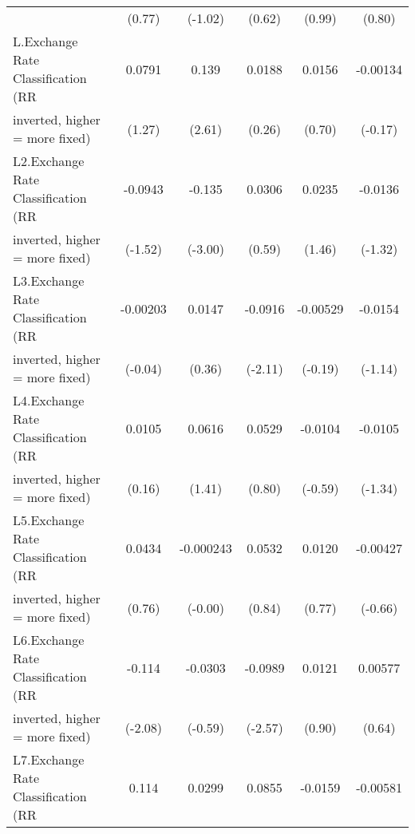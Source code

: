 {\begin{tabular}{l*{5}{c}}
                                        &    (0.77)         &   (-1.02)         &    (0.62)         &    (0.99)         &    (0.80)         \\
\addlinespace
L.Exchange Rate Classification (RR      &    0.0791         &     0.139\sym{*}  &    0.0188         &    0.0156         &  -0.00134         \\
inverted, higher = more fixed)          &    (1.27)         &    (2.61)         &    (0.26)         &    (0.70)         &   (-0.17)         \\
\addlinespace
L2.Exchange Rate Classification (RR     &   -0.0943         &    -0.135\sym{**} &    0.0306         &    0.0235         &   -0.0136         \\
inverted, higher = more fixed)          &   (-1.52)         &   (-3.00)         &    (0.59)         &    (1.46)         &   (-1.32)         \\
\addlinespace
L3.Exchange Rate Classification (RR     &  -0.00203         &    0.0147         &   -0.0916\sym{*}  &  -0.00529         &   -0.0154         \\
inverted, higher = more fixed)          &   (-0.04)         &    (0.36)         &   (-2.11)         &   (-0.19)         &   (-1.14)         \\
\addlinespace
L4.Exchange Rate Classification (RR     &    0.0105         &    0.0616         &    0.0529         &   -0.0104         &   -0.0105         \\
inverted, higher = more fixed)          &    (0.16)         &    (1.41)         &    (0.80)         &   (-0.59)         &   (-1.34)         \\
\addlinespace
L5.Exchange Rate Classification (RR     &    0.0434         & -0.000243         &    0.0532         &    0.0120         &  -0.00427         \\
inverted, higher = more fixed)          &    (0.76)         &   (-0.00)         &    (0.84)         &    (0.77)         &   (-0.66)         \\
\addlinespace
L6.Exchange Rate Classification (RR     &    -0.114\sym{*}  &   -0.0303         &   -0.0989\sym{*}  &    0.0121         &   0.00577         \\
inverted, higher = more fixed)          &   (-2.08)         &   (-0.59)         &   (-2.57)         &    (0.90)         &    (0.64)         \\
\addlinespace
L7.Exchange Rate Classification (RR     &     0.114\sym{*}  &    0.0299         &    0.0855         &   -0.0159         &  -0.00581         \\

\end{tabular}}
